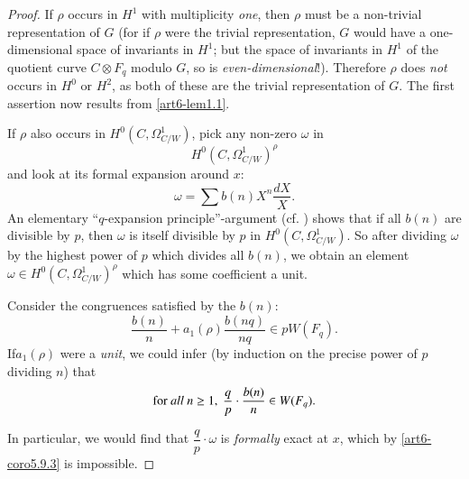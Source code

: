 \begin{proof}
If $\rho$ occurs in $H^{1}$ with multiplicity {\em one}, then $\rho$ must be a non-trivial representation of $G$ (for if $\rho$ were the trivial representation, $G$ would have a one-dimensional space of invariants in $H^{1}$; but the space of invariants in $H^{1}$ of the quotient curve $C\otimes F_{q}$ modulo $G$, so is {\em even-dimensional}!). Therefore $\rho$ does {\em not} occurs in $H^{0}$ or $H^{2}$, as both of these are the trivial representation of $G$. The first assertion now results from \eqref{art6-lem1.1}.

If $\rho$ also occurs in $H^{0}(C,\Omega^{1}_{C/W})$, pick any non-zero $\omega$ in 
$$
H^{0}(C,\Omega^{1}_{C/W})^{\rho}
$$ 
and look at its formal expansion around $x$:
$$
\omega=\sum b(n)X^{n}\dfrac{dX}{X}.
$$
An elementary ``$q$-expansion principle''-argument (cf. \cite{art6-key28}) shows that if all $b(n)$ are divisible by $p$, then $\omega$ is itself divisible by $p$ in $H^{0}(C,\Omega^{1}_{C/W})$. So after dividing $\omega$ by the highest power of $p$ which divides all $b(n)$, we obtain an element $\omega\in H^{0}(C,\Omega^{1}_{C/W})^{\rho}$ which has some coefficient a unit.

Consider the congruences satisfied by the $b(n)$:
$$
\frac{b(n)}{n}+a_{1}(\rho)\frac{b(nq)}{nq}\in pW(F_{q}).
$$
If\pageoriginale $a_{1}(\rho)$ were a {\em unit}, we could infer (by induction on the precise power of $p$ dividing $n$) that
$$
\text{for {\em all} } n\geq 1, \ \frac{q}{p}\cdot \frac{b(n)}{n}\in W(F_{q}).
$$

In particular, we would find that $\dfrac{q}{p}\cdot \omega$ is {\em formally} exact at $x$, which by \eqref{art6-coro5.9.3} is impossible.


\end{proof}
